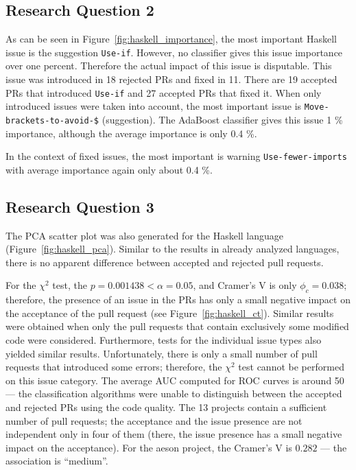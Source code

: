 \documentclass[digital,oneside,oldtable,nolof,nolot,nocover]{fithesis4}
\begin{document}
\subsection{Research Question 2}
\label{sec:org1a1c431}
As can be seen in Figure~\ref{fig:haskell_importance},
the most important Haskell issue is the suggestion \texttt{Use-if}.
However, no classifier gives this
issue importance over one percent. Therefore the actual impact of this issue is disputable.
This issue was introduced in 18 rejected PRs and fixed in 11. There are 19 accepted PRs that
introduced \texttt{Use-if} and 27 accepted PRs that fixed it.
When only introduced issues were taken into account, the most important
issue is \texttt{Move-brackets-to-avoid-\$} (suggestion). The AdaBoost classifier
gives this issue 1 \% importance, although the average importance is only 0.4 \%.

In the context of fixed issues, the most important is warning
\texttt{Use-fewer-imports} with average importance again only about 0.4 \%.
\subsection{Research Question 3}
\label{sec:orgc3fd387}
The PCA scatter plot was also generated for the Haskell language (Figure~\ref{fig:haskell_pca}).
Similar to the results in already analyzed languages, there is no apparent
difference between accepted and rejected pull requests.

For the \(\chi^2\) test, the \(p = 0.001438 < \alpha = 0.05\), and Cramer's V is only \(\phi_c = 0.038\);
therefore, the presence of an issue in the PRs has only a small negative impact on the
acceptance of the pull request (see Figure~\ref{fig:haskell_ct}). Similar results were obtained when only
the pull requests that contain exclusively some modified code were considered.
Furthermore, tests for the individual issue types also yielded similar results.
Unfortunately, there is only a small number of pull requests that introduced some errors;
therefore, the \(\chi^2\) test cannot be performed on this issue category.
The average AUC computed for ROC curves is around 50 --- the classification algorithms
were unable to distinguish between the accepted and rejected PRs using the code quality.
The 13 projects contain a sufficient number of pull requests; the acceptance and
the issue presence are not independent only in four of them (there, the issue presence
has a small negative impact on the acceptance). For the aeson project,
the Cramer's V is \(0.282\) --- the association is ``medium''.
\end{document}
